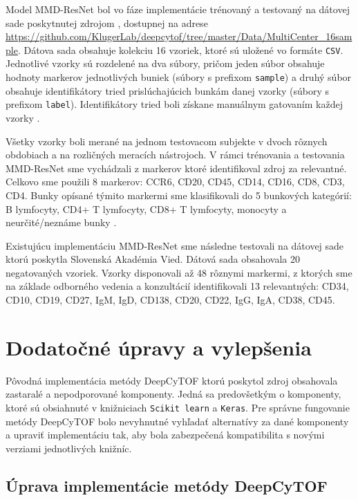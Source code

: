 Model MMD-ResNet bol vo fáze implementácie trénovaný a testovaný na dátovej sade poskytnutej zdrojom \cite{Li2017}, dostupnej na adrese \url{https://github.com/KlugerLab/deepcytof/tree/master/Data/MultiCenter_16sample}. Dátova sada obsahuje kolekciu 16 vzoriek, ktoré sú uložené vo formáte \texttt{CSV}. Jednotlivé vzorky sú rozdelené na dva súbory, pričom jeden súbor obsahuje hodnoty markerov jednotlivých buniek (súbory s prefixom \texttt{sample}) a druhý súbor obsahuje identifikátory tried prislúchajúcich bunkám danej vzorky (súbory s prefixom \texttt{label}). Identifikátory tried boli získane manuálnym gatovaním každej vzorky \cite{Li2017}. 

Všetky vzorky boli merané na jednom testovacom subjekte v dvoch rôznych obdobiach a na rozličných meracích nástrojoch. V rámci trénovania a testovania MMD-ResNet sme vychádzali z markerov ktoré identifikoval zdroj \cite{Li2017} za relevantné. Celkovo sme použili 8 markerov: CCR6, CD20, CD45, CD14, CD16, CD8, CD3, CD4. Bunky opísané týmito markermi sme klasifikovali do 5 bunkových kategórií: B lymfocyty, CD4+ T lymfocyty, CD8+ T lymfocyty, monocyty a neurčité/neznáme bunky \cite{Li2017}.

Existujúcu implementáciu MMD-ResNet sme následne testovali na dátovej sade ktorú poskytla Slovenská Akadémia Vied. Dátová sada obsahovala 20 negatovaných vzoriek. Vzorky disponovali až 48 rôznymi markermi, z ktorých sme na základe odborného vedenia a konzultácií identifikovali 13 relevantných: CD34, CD10, CD19, CD27, IgM, IgD, CD138, CD20, CD22, IgG, IgA, CD38, CD45.

\section{Dodatočné úpravy a vylepšenia}

Pôvodná implementácia metódy DeepCyTOF ktorú poskytol zdroj \cite{Li2017} obsahovala zastaralé a nepodporované komponenty. Jedná sa predovšetkým o komponenty, ktoré sú obsiahnuté v knižniciach \texttt{Scikit learn} a \texttt{Keras}. Pre správne fungovanie metódy DeepCyTOF bolo nevyhnutné vyhľadať alternatívy za dané komponenty a upraviť implementáciu tak, aby bola zabezpečená kompatibilita s novými verziami jednotlivých knižníc.

\subsection{Úprava implementácie metódy DeepCyTOF}

